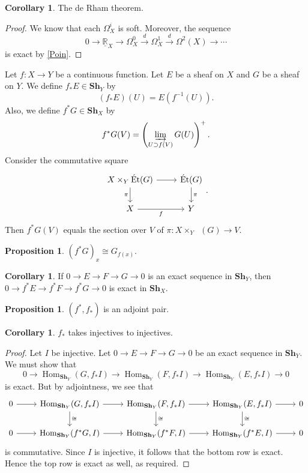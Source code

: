 \documentclass[10pt,letterpaper,cm]{nupset}
\theoremstyle{definition}
\theoremstyle{theorem}
\newtheorem{prop}[definition]{Proposition}
\newtheorem{corollary}[definition]{Corollary}
\theoremstyle{remark}
\newcommand{\R}{\mathbb{R}}
\newcommand{\1}{\mathbb{1}}
\newcommand{\0}{\vec 0}
\DeclareMathOperator{\Hom}{Hom}
\DeclareMathOperator{\Et}{\acute{E}t}
\begin{document}
\begin{corollary}
The de Rham theorem.
\end{corollary}
\begin{proof}
We know that each $\Omega_X^i$ is soft. Moreover, the sequence $$0 \to \underline{\R}_X \to \Omega_X^0 \overset{d}{\longrightarrow} \Omega_X^1 \overset{d}{\longrightarrow} \Omega^2(X) \to \cdots$$ is exact by \cref{Poin}.
\end{proof}

\medskip


Let $f :X \to Y$ be a continuous function. Let $E$ be a sheaf on $X$ and $G$ be a sheaf on $Y$. We define $f_{\ast}{E} \in \mathbf{Sh}_Y$ by $$(f_{\ast}{E})(U) = E(f^{-1}(U)).$$ Also, we define $f^{\ast}{G} \in \mathbf{Sh}_X$ by $$f^{\ast}{G}(V) = \left(\varinjlim_{U \supset f(V)} G(U)\right)^{+}.$$ Consider the commutative square
\[\begin{tikzcd}
 X \times_Y \Et(G) \arrow[d, "\pi"'] \arrow[r] & \Et(G) \arrow[d, "\pi"] \\
X \arrow[r, "f"']                              & Y                      
\end{tikzcd}
.\] Then $f^{\ast}{G}(V)$ equals the section over $V$ of  $\pi : X \times_Y \Et(G) \to V$.


\begin{prop}
$\left(f^{\ast}{G}\right)_x \cong G_{f(x)}$.
\end{prop}

\begin{corollary}
If $0 \to E \to F \to G \to 0$ is an exact sequence in $\mathbf{Sh}_Y$, then $0 \to f^{\ast}{E} \to f^{\ast}{F} \to f^{\ast}{G} \to 0$ is exact in $\mathbf{Sh}_X$.
\end{corollary}

\begin{prop}
$\left(f^{\ast}, f_{\ast}\right)$ is an adjoint pair.
\end{prop}

\begin{corollary}
$f_{\ast}$ takes injectives to injectives.
\end{corollary}
\begin{proof}
Let $I$ be injective. Let $0 \to E \to F \to G \to 0$ be an exact sequence in $\mathbf{Sh}_Y$. We must show that $$ 0 \to \Hom_{\mathbf{Sh}_Y}(G, f_{\ast}I) \to \Hom_{\mathbf{Sh}_Y}(F, f_{\ast}I)   \to  \Hom_{\mathbf{Sh}_Y}(E, f_{\ast}I) \to 0  $$ is exact. But by adjointness, we see that
\[
\begin{tikzcd}
0 \arrow[r] & { \Hom_{\mathbf{Sh}_Y}(G, f_{\ast}I)} \arrow[r] \arrow[d, "\cong"] & { \Hom_{\mathbf{Sh}_Y}(F, f_{\ast}I)} \arrow[r] \arrow[d, "\cong"]         & { \Hom_{\mathbf{Sh}_Y}(E, f_{\ast}I)} \arrow[r] \arrow[d, "\cong"] & 0 \\
0 \arrow[r] & { \Hom_{\mathbf{Sh}_Y}(f^{\ast}G, I)} \arrow[r]                    &  {\Hom_{\mathbf{Sh}_Y}(f^{\ast}F, I)} \arrow[r] & { \Hom_{\mathbf{Sh}_Y}(f^{\ast}E, I)} \arrow[r]                    & 0
\end{tikzcd}
\] is commutative. Since $I$ is injective, it follows that the bottom row is exact. Hence the top row is exact as well, as required. 
\end{proof}
\end{document}
